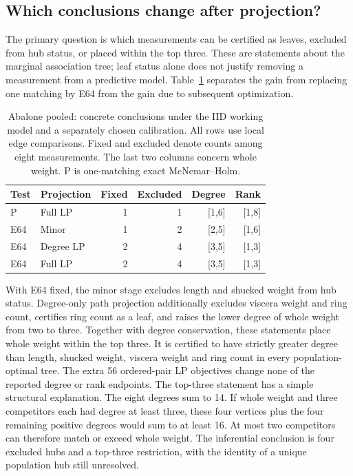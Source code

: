 \subsection{Which conclusions change after projection?}\label{sec:decision-application}
The primary question is which measurements can be certified as leaves, excluded from hub status, or placed within the top three. These are statements about the marginal association tree; leaf status alone does not justify removing a measurement from a predictive model. Table~\ref{tab:decision-abalone} separates the gain from replacing one matching by E64 from the gain due to subsequent optimization.


\begin{table}[H]\centering\small
\setlength{\tabcolsep}{4pt}
\caption{Abalone pooled: concrete conclusions under the IID working model and a separately chosen calibration. All rows use local edge comparisons. Fixed and excluded denote counts among eight measurements. The last two columns concern whole weight. P is one-matching exact McNemar--Holm.}\label{tab:decision-abalone}
\begin{lrbox}{\resultsbox}\begin{tabular}{llrrrr}
\toprule
Test & Projection & Fixed & Excluded & Degree & Rank\\
\midrule
P & Full LP & 1 & 1 & [1,6] & [1,8]\\
E64 & Minor & 1 & 2 & [2,5] & [1,6]\\
E64 & Degree LP & 2 & 4 & [3,5] & [1,3]\\
E64 & Full LP & 2 & 4 & [3,5] & [1,3]\\
\bottomrule\end{tabular}\end{lrbox}\ifdim\wd\resultsbox>\linewidth\resizebox{\linewidth}{!}{\usebox{\resultsbox}}\else\usebox{\resultsbox}\fi\end{table}


With E64 fixed, the minor stage excludes length and shucked weight from hub status. Degree-only path projection additionally excludes viscera weight and ring count, certifies ring count as a leaf, and raises the lower degree of whole weight from two to three. Together with degree conservation, these statements place whole weight within the top three. It is certified to have strictly greater degree than length, shucked weight, viscera weight and ring count in every population-optimal tree. The extra 56 ordered-pair LP objectives change none of the reported degree or rank endpoints. The top-three statement has a simple structural explanation. The eight degrees sum to 14. If whole weight and three competitors each had degree at least three, these four vertices plus the four remaining positive degrees would sum to at least 16. At most two competitors can therefore match or exceed whole weight. The inferential conclusion is four excluded hubs and a top-three restriction, with the identity of a unique population hub still unresolved.


